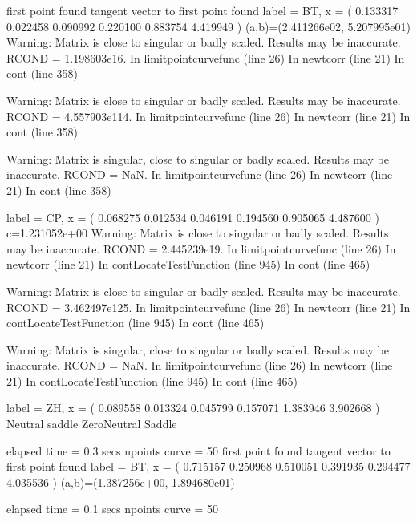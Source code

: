 \documentclass[letterpaper,10pt,english]{jupyterBook}
\begin{document}
\begin{sphinxVerbatim}[commandchars=\\\{\}]
first point found
tangent vector to first point found
label = BT, x = ( \PYGZhy{}0.133317 0.022458 0.090992 \PYGZhy{}0.220100 0.883754 4.419949 )
(a,b)=(\PYGZhy{}2.411266e\PYGZhy{}02, \PYGZhy{}5.207995e\PYGZhy{}01)
Warning: Matrix is close to singular or badly scaled. Results may be inaccurate. RCOND =  1.198603e\PYGZhy{}16.
\PYGZgt{} In limitpoint\PYGZgt{}curve\PYGZus{}func (line 26)
In newtcorr (line 21)
In cont (line 358)

Warning: Matrix is close to singular or badly scaled. Results may be inaccurate. RCOND = 4.557903e\PYGZhy{}114.
\PYGZgt{} In limitpoint\PYGZgt{}curve\PYGZus{}func (line 26)
In newtcorr (line 21)
In cont (line 358)

Warning: Matrix is singular, close to singular or badly scaled. Results may be inaccurate. RCOND = NaN.
\PYGZgt{} In limitpoint\PYGZgt{}curve\PYGZus{}func (line 26)
In newtcorr (line 21)
In cont (line 358)

label = CP, x = ( \PYGZhy{}0.068275 0.012534 0.046191 \PYGZhy{}0.194560 0.905065 4.487600 )
c=1.231052e+00
Warning: Matrix is close to singular or badly scaled. Results may be inaccurate. RCOND =  2.445239e\PYGZhy{}19.
\PYGZgt{} In limitpoint\PYGZgt{}curve\PYGZus{}func (line 26)
In newtcorr (line 21)
In cont\PYGZgt{}LocateTestFunction (line 945)
In cont (line 465)

Warning: Matrix is close to singular or badly scaled. Results may be inaccurate. RCOND = 3.462497e\PYGZhy{}125.
\PYGZgt{} In limitpoint\PYGZgt{}curve\PYGZus{}func (line 26)
In newtcorr (line 21)
In cont\PYGZgt{}LocateTestFunction (line 945)
In cont (line 465)

Warning: Matrix is singular, close to singular or badly scaled. Results may be inaccurate. RCOND = NaN.
\PYGZgt{} In limitpoint\PYGZgt{}curve\PYGZus{}func (line 26)
In newtcorr (line 21)
In cont\PYGZgt{}LocateTestFunction (line 945)
In cont (line 465)

label = ZH, x = ( 0.089558 0.013324 \PYGZhy{}0.045799 \PYGZhy{}0.157071 1.383946 3.902668 )
Neutral saddle
Zero\PYGZhy{}Neutral Saddle

elapsed time  = 0.3 secs
npoints curve = 50
first point found
tangent vector to first point found
label = BT, x = ( \PYGZhy{}0.715157 \PYGZhy{}0.250968 0.510051 \PYGZhy{}0.391935 0.294477 4.035536 )
(a,b)=(\PYGZhy{}1.387256e+00, 1.894680e\PYGZhy{}01)

elapsed time  = 0.1 secs
npoints curve = 50
\end{sphinxVerbatim}
\end{document}
